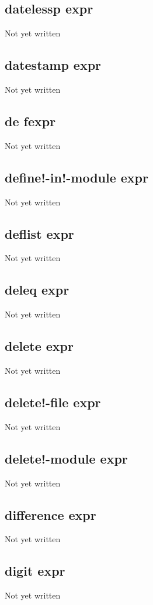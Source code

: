 \documentclass[a4paper,11pt]{article}
\begin{document}
{\subsection{\ttfamily datelessp expr}
Not yet written

\subsection{\ttfamily datestamp expr}
Not yet written

\subsection{\ttfamily de fexpr}
Not yet written

\subsection{\ttfamily define!-in!-module expr}
Not yet written

\subsection{\ttfamily deflist expr}
Not yet written

\subsection{\ttfamily deleq expr}
Not yet written

\subsection{\ttfamily delete expr}
Not yet written

\subsection{\ttfamily delete!-file expr}
Not yet written

\subsection{\ttfamily delete!-module expr}
Not yet written

\subsection{\ttfamily difference expr}
Not yet written

\subsection{\ttfamily digit expr}
Not yet written

}
\end{document}
